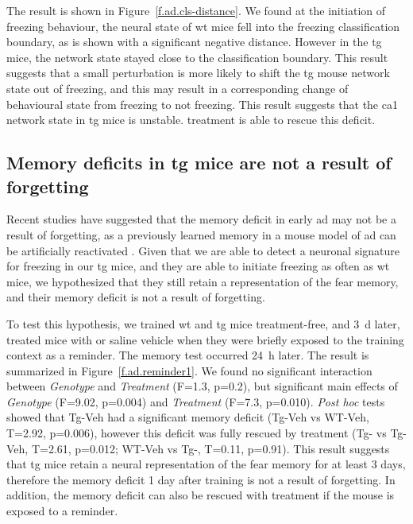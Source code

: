 The result is shown in Figure~\ref{f.ad.cls-distance}. We found at the initiation of freezing behaviour, the neural state of \gls{wt} mice fell into the freezing classification boundary, as is shown with a significant negative distance. However in the \gls{tg} mice, the network state stayed close to the classification boundary. This result suggests that a small perturbation is more likely to shift the \gls{tg} mouse network state out of freezing, and this may result in a corresponding change of behavioural state from freezing to not freezing. This result suggests that the \gls{ca1} network state in \gls{tg} mice is unstable. \tglu{} treatment is able to rescue this deficit. 

\subsection{Memory deficits in \Gls{tg} mice are not a result of forgetting}

Recent studies have suggested that the memory deficit in early \gls{ad} may not be a result of forgetting, as a previously learned memory in a mouse model of \gls{ad} can be artificially reactivated \citep{roy16}. Given that we are able to detect a neuronal signature for freezing in our \gls{tg} mice, and they are able to initiate freezing as often as \gls{wt} mice, we hypothesized that they still retain a representation of the fear memory, and their memory deficit is not a result of forgetting.

To test this hypothesis, we trained \gls{wt} and \gls{tg} mice treatment-free, and \SI{3}{\day} later, treated mice with \tglu{} or saline vehicle when they were briefly exposed to the training context as a reminder. The memory test occurred \SI{24}{\hour} later. The result is summarized in Figure~\ref{f.ad.reminder1}. We found no significant interaction between \textit{Genotype} and \textit{Treatment} (F=1.3, p=0.2), but significant main effects of \textit{Genotype} (F=9.02, p=0.004) and \textit{Treatment} (F=7.3, p=0.010). \textit{Post hoc} tests showed that Tg-Veh had a significant memory deficit (Tg-Veh vs WT-Veh, T=2.92, p=0.006), however this deficit was fully rescued by \tglu{} treatment (Tg-\glu{} vs Tg-Veh, T=2.61, p=0.012; WT-Veh vs Tg-\glu{}, T=0.11, p=0.91). This result suggests that \gls{tg} mice retain a neural representation of the fear memory for at least 3 days, therefore the memory deficit 1 day after training is not a result of forgetting. In addition, the memory deficit can also be rescued with \tglu{} treatment if the mouse is exposed to a reminder.


